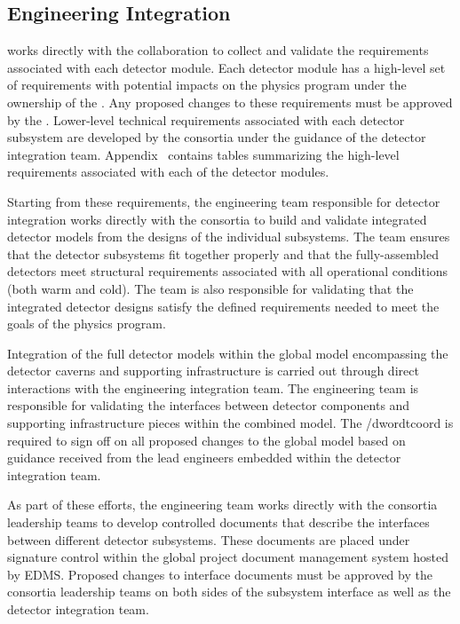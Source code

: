 \subsection{Engineering Integration}

  works directly with the collaboration to
collect and validate the requirements associated with each detector
module.  Each detector module has a high-level set of requirements
with potential impacts on the  physics program under
the ownership of the  .  Any proposed
changes to these requirements must be approved by the .
Lower-level technical requirements associated with each detector
subsystem are developed by the consortia under the guidance of
the  detector integration team.  Appendix~\label{appD}
contains tables summarizing the high-level requirements associated
with each of the detector modules.

Starting from these requirements, the  engineering
team responsible for detector integration works directly with the
 consortia to build and validate integrated detector
models from the designs of the individual subsystems.  The team
ensures that the detector subsystems fit together properly and
that the fully-assembled detectors meet structural requirements
associated with all operational conditions (both warm and cold).
The team is also responsible for validating that the integrated
detector designs satisfy the defined requirements needed to meet
the goals of the  physics program.

Integration of the full detector models within the global model
encompassing the detector caverns and supporting infrastructure
is carried out through direct interactions with the 
engineering integration team.  The  engineering team
is responsible for validating the interfaces between 
detector components and supporting infrastructure pieces within
the combined model.  The /dword{tcoord} is required to sign off
on all proposed changes to the global model based on guidance
received from the lead engineers embedded within the 
detector integration team.

As part of these efforts, the engineering team works directly
with the consortia leadership teams to develop controlled
documents that describe the interfaces between different detector
subsystems.  These documents are placed under signature control
within the global project document management system hosted by
EDMS.  Proposed changes to interface documents must be approved
by the consortia leadership teams on both sides of the subsystem
interface as well as the  detector integration team.

